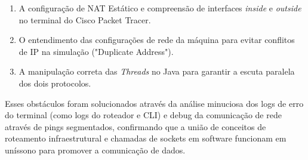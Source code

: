 \documentclass[12pt,a4paper]{article}
\begin{document}
\begin{enumerate}
  \item A configuração de NAT Estático e compreensão de interfaces \textit{inside} e \textit{outside} no terminal do Cisco Packet Tracer.
  \item O entendimento das configurações de rede da máquina para evitar conflitos de IP na simulação ("Duplicate Address").
  \item A manipulação correta das \textit{Threads} no Java para garantir a escuta paralela dos dois protocolos.
\end{enumerate}

Esses obstáculos foram solucionados através da análise minuciosa dos logs de erro do terminal (como logs do roteador e CLI) e debug da comunicação de rede através de pings segmentados, confirmando que a união de conceitos de roteamento infraestrutural e chamadas de sockets em software funcionam em uníssono para promover a comunicação de dados.
\end{document}
